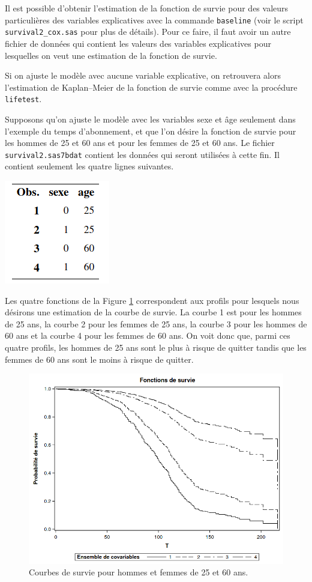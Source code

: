 \documentclass[
  11pt,
  letterpaper,
]{book}
\theoremstyle{definition}
\theoremstyle{definition}
\theoremstyle{definition}
\theoremstyle{remark}
\begin{document}
Il est possible d'obtenir l'estimation de la fonction de survie pour des valeurs particulières des variables explicatives avec la commande \texttt{baseline} (voir le script \texttt{survival2\_cox.sas} pour plus de détails). Pour ce faire, il faut avoir un autre fichier de données qui contient les valeurs des variables explicatives pour lesquelles on veut une estimation de la fonction de survie.

Si on ajuste le modèle avec aucune variable explicative, on retrouvera alors l'estimation de Kaplan--Meier de la fonction de survie comme avec la procédure \texttt{lifetest}.

Supposons qu'on ajuste le modèle avec les variables sexe et âge seulement dans l'exemple du temps d'abonnement, et que l'on désire la fonction de survie pour les hommes de 25 et 60 ans et pour les femmes de 25 et 60 ans. Le fichier \texttt{survival2.sas7bdat} contient les données qui seront utilisées à cette fin. Il contient seulement les quatre lignes suivantes.

\begin{center}\includegraphics[width=0.15\linewidth]{figures/05-survie-e19} \end{center}

Les quatre fonctions de la Figure \ref{fig:fig5-e20} correspondent aux profils pour lesquels nous désirons une estimation de la courbe de survie. La courbe 1 est pour les hommes de 25 ans, la courbe 2 pour les femmes de 25 ans, la courbe 3 pour les hommes de 60 ans et la courbe 4 pour les femmes de 60 ans. On voit donc que, parmi ces quatre profils, les hommes de 25 ans sont le plus à risque de quitter tandis que les femmes de 60 ans sont le moins à risque de quitter.

\begin{figure}

{\centering \includegraphics[width=0.8\linewidth]{figures/05-survie-e20} 

}

\caption{Courbes de survie pour hommes et femmes de 25 et 60 ans.}\label{fig:fig5-e20}
\end{figure}
\end{document}
